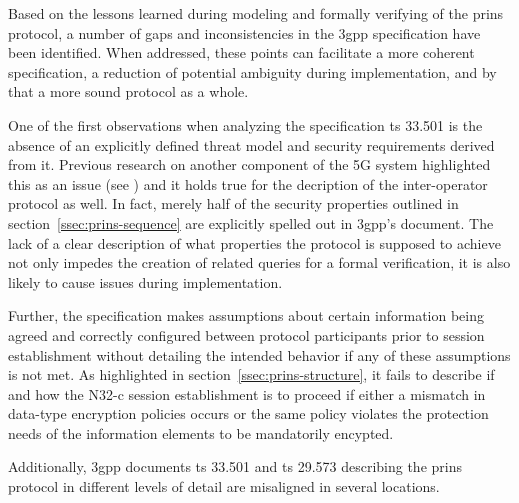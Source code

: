Based on the lessons learned during modeling and formally verifying of the \gls{prins} protocol, a number of gaps and inconsistencies in the \gls{3gpp} specification have been identified.
When addressed, these points can facilitate a more coherent specification, a reduction of potential ambiguity during implementation, and by that a more sound protocol as a whole.

One of the first observations when analyzing the specification \gls{ts} 33.501 is the absence of an explicitly defined threat model and security requirements derived from it.
Previous research on another component of the 5G system highlighted this as an issue (see \cite{basin2018model}) and it holds true for the decription of the inter-operator protocol as well.
In fact, merely half of the security properties outlined in section~\ref{ssec:prins-sequence} are explicitly spelled out in \gls{3gpp}'s document.
The lack of a clear description of what properties the protocol is supposed to achieve not only impedes the creation of related queries for a formal verification, it is also likely to cause issues during implementation.

Further, the specification makes assumptions about certain information being agreed and correctly configured between protocol participants prior to session establishment without detailing the intended behavior if any of these assumptions is not met.
As highlighted in section~\ref{ssec:prins-structure}, it fails to describe if and how the N32-c session establishment is to proceed if either a mismatch in data-type encryption policies occurs or the same policy violates the protection needs of the information elements to be mandatorily encypted.

Additionally, \gls{3gpp} documents \gls{ts} 33.501 and \gls{ts} 29.573 describing the \gls{prins} protocol in different levels of detail are misaligned in several locations.

